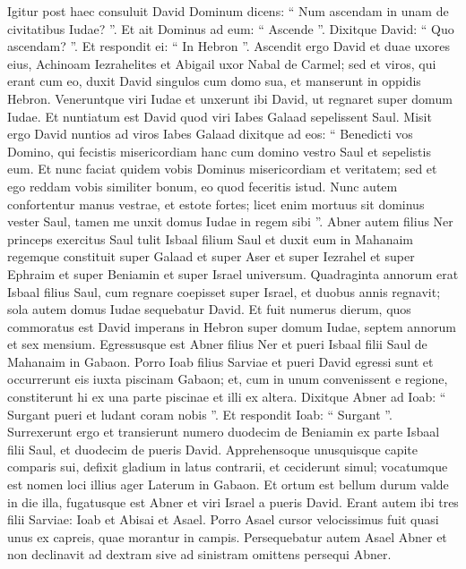 \begin{biblechapter}
\begin{biblechapter}
\verse Igitur post haec consuluit David Dominum dicens: “ Num ascendam in unam de civitatibus Iudae? ”. Et ait Dominus ad eum: “ Ascende ”. Dixitque David: “ Quo ascendam? ”. Et respondit ei: “ In Hebron ”. 
\verse Ascendit ergo David et duae uxores eius, Achinoam Iezrahelites et Abigail uxor Nabal de Carmel; 
\verse sed et viros, qui erant cum eo, duxit David singulos cum domo sua, et manserunt in oppidis Hebron. 
\verse Veneruntque viri Iudae et unxerunt ibi David, ut regnaret super domum Iudae.
 Et nuntiatum est David quod viri Iabes Galaad sepelissent Saul. 
\verse Misit ergo David nuntios ad viros Iabes Galaad dixitque ad eos: “ Benedicti vos Domino, qui fecistis misericordiam hanc cum domino vestro Saul et sepelistis eum. 
\verse Et nunc faciat quidem vobis Dominus misericordiam et veritatem; sed et ego reddam vobis similiter bonum, eo quod feceritis istud. 
\verse Nunc autem confortentur manus vestrae, et estote fortes; licet enim mortuus sit dominus vester Saul, tamen me unxit domus Iudae in regem sibi ”.
 \verse Abner autem filius Ner princeps exercitus Saul tulit Isbaal filium Saul et duxit eum in Mahanaim 
\verse regemque constituit super Galaad et super Aser et super Iezrahel et super Ephraim et super Beniamin et super Israel universum. 
 \verse Quadraginta annorum erat Isbaal filius Saul, cum regnare coepisset super Israel, et duobus annis regnavit; sola autem domus Iudae sequebatur David. 
 \verse Et fuit numerus dierum, quos commoratus est David imperans in Hebron super domum Iudae, septem annorum et sex mensium.
 \verse Egressusque est Abner filius Ner et pueri Isbaal filii Saul de Mahanaim in Gabaon. 
\verse Porro Ioab filius Sarviae et pueri David egressi sunt et occurrerunt eis iuxta piscinam Gabaon; et, cum in unum convenissent e regione, constiterunt hi ex una parte piscinae et illi ex altera. 
\verse Dixitque Abner ad Ioab: “ Surgant pueri et ludant coram nobis ”. Et respondit Ioab: “ Surgant ”. 
\verse Surrexerunt ergo et transierunt numero duodecim de Beniamin ex parte Isbaal filii Saul, et duodecim de pueris David. 
\verse Apprehensoque unusquisque capite comparis sui, defixit gladium in latus contrarii, et ceciderunt simul; vocatumque est nomen loci illius ager Laterum in Gabaon.
 \verse Et ortum est bellum durum valde in die illa, fugatusque est Abner et viri Israel a pueris David. 
\verse Erant autem ibi tres filii Sarviae: Ioab et Abisai et Asael. Porro Asael cursor velocissimus fuit quasi unus ex capreis, quae morantur in campis. 
\verse Persequebatur autem Asael Abner et non declinavit ad dextram sive ad sinistram omittens persequi Abner. 

\end{biblechapter}
\end{biblechapter}
